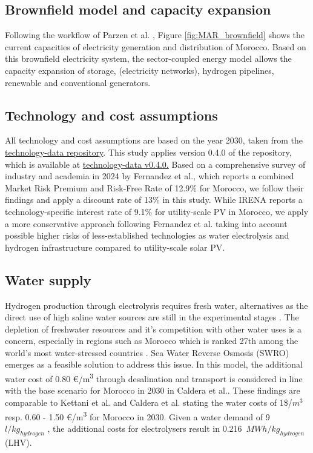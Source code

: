 \documentclass[5p,numafflabel]{elsarticle}
\begin{document}
\subsection*{Brownfield model and capacity expansion}
\label{brownfield_model}
Following the workflow of Parzen et al. \cite{Parzen2023}, Figure \ref{fig:MAR_brownfield} shows the current capacities of electricity generation and distribution of Morocco. Based on this brownfield electricity system, the sector-coupled energy model allows the capacity expansion of storage, (electricity networks), hydrogen pipelines, renewable and conventional generators.

\subsection*{Technology and cost assumptions}
\label{subsec:tech_assump}
All technology and cost assumptions are based on the year 2030, taken from the \href{https://github.com/pypsa/technology-data}{technology-data repository}. This study applies version 0.4.0 of the repository, which is available at \href{https://github.com/PyPSA/technology-data/blob/v0.4.0/outputs/costs_2030.csv}{technology-data v0.4.0.}
Based on a comprehensive survey of industry and academia in 2024 by Fernandez et al.\cite{Fernandez2024}, which reports a combined Market Risk Premium and Risk-Free Rate of 12.9\% for Morocco, we follow their findings and apply a discount rate of 13\% in this study. While IRENA\cite{IRENA2023} reports a technology-specific interest rate of 9.1\% for utility-scale PV in Morocco, we apply a more conservative approach following Fernandez et al.\cite{Fernandez2024} taking into account possible higher risks of less-established technologies as water electrolysis and hydrogen infrastructure compared to utility-scale solar PV.



\subsection*{Water supply}
\label{subsec:water_supply}
Hydrogen production through electrolysis requires fresh water, alternatives as the direct use of high saline water sources are still in the experimental stages \cite{Tong2020}. The depletion of freshwater resources and it's competition with other water uses is a concern, especially in regions such as Morocco which is ranked 27th among the world's most water-stressed countries \cite{Maddocks2015}. 
Sea Water Reverse Osmosis (SWRO) emerges as a feasible solution to address this issue. In this model, the additional water cost of 0.80 €/\si{\cubic\metre} through desalination and transport is considered in line with the base scenario for Morocco in 2030 in Caldera et al.\cite{Caldera2020}. These findings are comparable to Kettani et al.\cite{Kettani2020} and Caldera et al.\cite{Caldera2016} stating the water costs of 1\$/$m^3$ resp. 0.60 - 1.50 €/\si{\cubic\metre} for Morocco in 2030. Given a water demand of 9~$l/kg_{hydrogen}$
\cite{Hampp2023}, the additional costs for electrolysers result in 0.216~$MWh/kg_{hydrogen}$ (LHV).
\end{document}
